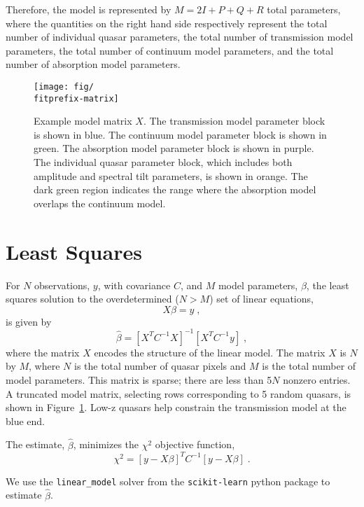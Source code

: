 \documentclass[oneside,10pt]{article}
\providecommand{\fig}[1]{Figure~\ref{fig:#1}}
\providecommand{\fitprefix}{random-n10000}
\begin{document}
Therefore, the model is represented by $M = 2I + P + Q + R$ total parameters, where the quantities on the right hand side respectively represent
the total number of individual quasar parameters, the total number of transmission model parameters, 
the total number of continuum model parameters, and the total number of absorption model parameters.

\begin{figure}
\texttt{[image: fig/\\fitprefix-matrix]}
\centering
\caption{Example model matrix $X$. The transmission model parameter block is shown in blue. The continuum model parameter 
block is shown in green. The absorption model parameter block is shown in purple. The individual quasar parameter block, 
which includes both amplitude and spectral tilt parameters, is shown in orange. The dark green region indicates the 
range where the absorption model overlaps the continuum model.}
\label{fig:modelMatrix}
\end{figure}

\section{Least Squares}

For $N$ observations, $y$, with covariance $C$, and $M$ model parameters, $\beta$, the least squares solution to the overdetermined ($N > M$) set of linear equations, 
\begin{equation}
X \beta = y \; ,
\label{eqn:syseqs}
\end{equation}
is given by
\begin{equation}
\hat \beta = [X^T C^{-1} X]^{-1} [X^T C^{-1} y] \; ,
\end{equation}
where the matrix $X$ encodes the structure of the linear model. The matrix $X$ is $N$ by $M$, where $N$ is the total number 
of quasar pixels and $M$ is the total number of model parameters. This matrix is sparse; there are less than 5$N$ nonzero
entries. A truncated model matrix, selecting rows corresponding to 5 random quasars, is shown in \fig{modelMatrix}. 
Low-z quasars help constrain the transmission model at the blue end.

The estimate, $\hat\beta$, minimizes the $\chi^2$ objective function,
\begin{equation}
\chi^2 = [ y - X \beta ]^T C^{-1} [ y - X \beta ]  \; .
\end{equation}

We use the \verb+linear_model+ solver from the \verb+scikit-learn+ python package to estimate $\hat\beta$.
\end{document}
